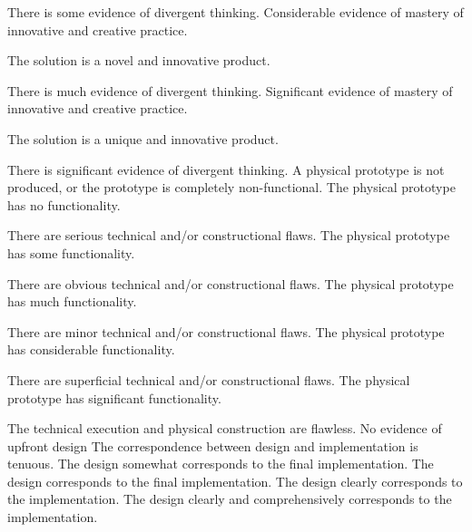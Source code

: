 \documentclass{../fal_assignment}
\begin{document}
\begin{markingrubric}
            \par There is some evidence of divergent thinking.
        \grade Considerable evidence of mastery of innovative and creative practice.
            \par The solution is a novel and innovative product.
            \par There is much evidence of divergent thinking.
        \grade Significant evidence of mastery of innovative and creative practice.
            \par The solution is a unique and innovative product.
            \par There is significant evidence of divergent thinking.
%            
        \grade\fail A physical prototype is not produced, or the prototype is completely non-functional.
        \grade The physical prototype has no functionality.
            \par There are serious technical and/or constructional flaws.
        \grade The physical prototype has some functionality.
            \par There are obvious technical and/or constructional flaws.
        \grade The physical prototype has much functionality.
            \par There are minor technical and/or constructional flaws.
        \grade The physical prototype has considerable functionality.
            \par There are superficial technical and/or constructional flaws.
        \grade The physical prototype has significant functionality.
            \par The technical execution and physical construction are flawless.
%
%
	\grade\fail No evidence of upfront design	
	\grade The correspondence between design and implementation is tenuous.
	\grade The design somewhat corresponds to the final implementation.	
	\grade The design corresponds to the final implementation.
	\grade The design clearly corresponds to the implementation.
	\grade The design clearly and comprehensively corresponds to the implementation.
%

\end{markingrubric}
\end{document}
